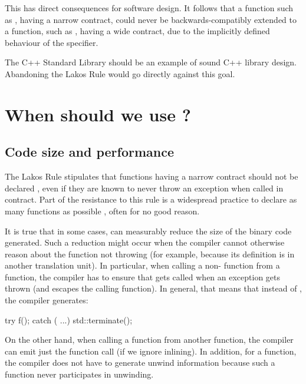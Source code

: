 This has direct consequences for software design. It follows that a function such as , having a narrow contract, could never be backwards-compatibly extended to a function, such as , having a wide contract, due to the implicitly defined behaviour of the  specifier. 

The C++ Standard Library should be an example of sound C++ library design. Abandoning the Lakos Rule would go directly against this goal.

\section{When should we use ?}
\label{sec:noexcept}

\subsection{Code size and performance}

The Lakos Rule stipulates that functions having a narrow contract should not be declared , even if they are known to never throw an exception when called in contract. Part of the resistance to this rule is a widespread practice to declare as many functions as possible , often for no good reason.

It is true that in some cases,  can measurably reduce the size of the binary code generated. Such a reduction might occur when the compiler cannot otherwise reason about the function not throwing (for example, because its definition is in another translation unit). In particular, when calling a non- function  from a  function, the compiler has to ensure that  gets called when an exception gets thrown (and escapes the calling function). In general, that means that instead of , the compiler generates:
\begin{codeblock}
try { f(); } catch ( ...) { std::terminate(); }
\end{codeblock}
On the other hand, when calling a  function from another  function, the compiler can emit just the function call (if we ignore inlining). In addition, for a  function, the compiler does not have to generate unwind information because such a function never participates in unwinding.

